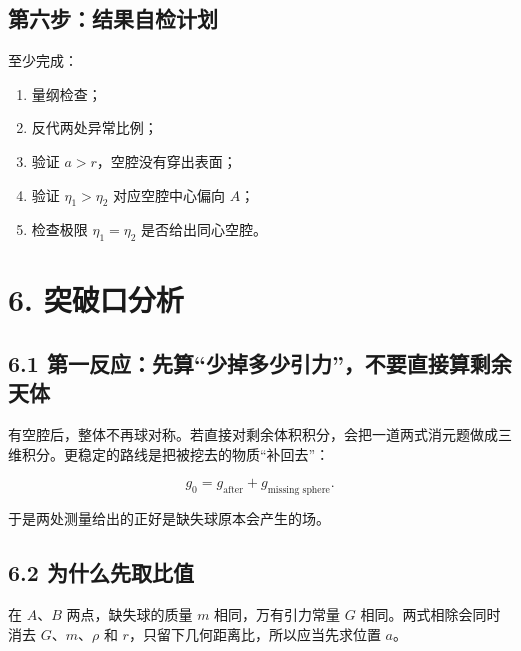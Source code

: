 \documentclass[
  11pt,
  UTF8]{ctexart}
\providecommand{\tightlist}{%
  \setlength{\itemsep}{0pt}\setlength{\parskip}{0pt}}
\begin{document}
\hypertarget{ux7b2cux516dux6b65ux7ed3ux679cux81eaux68c0ux8ba1ux5212}{%
\subsection{第六步：结果自检计划}\label{ux7b2cux516dux6b65ux7ed3ux679cux81eaux68c0ux8ba1ux5212}}

至少完成：

\begin{enumerate}
\def\labelenumi{\arabic{enumi}.}
\tightlist
\item
  量纲检查；
\item
  反代两处异常比例；
\item
  验证 \(a>r\)，空腔没有穿出表面；
\item
  验证 \(η_1>η_2\) 对应空腔中心偏向 \(A\)；
\item
  检查极限 \(η_1=η_2\) 是否给出同心空腔。
\end{enumerate}

\hypertarget{ux7a81ux7834ux53e3ux5206ux6790}{%
\section{6. 突破口分析}\label{ux7a81ux7834ux53e3ux5206ux6790}}

\hypertarget{ux7b2cux4e00ux53cdux5e94ux5148ux7b97ux5c11ux6389ux591aux5c11ux5f15ux529bux4e0dux8981ux76f4ux63a5ux7b97ux5269ux4f59ux5929ux4f53}{%
\subsection{6.1
第一反应：先算``少掉多少引力''，不要直接算剩余天体}\label{ux7b2cux4e00ux53cdux5e94ux5148ux7b97ux5c11ux6389ux591aux5c11ux5f15ux529bux4e0dux8981ux76f4ux63a5ux7b97ux5269ux4f59ux5929ux4f53}}

有空腔后，整体不再球对称。若直接对剩余体积积分，会把一道两式消元题做成三维积分。更稳定的路线是把被挖去的物质``补回去''：

\[g_0=g_{\text{after}}+g_{\text{missing sphere}}.\]

于是两处测量给出的正好是缺失球原本会产生的场。

\hypertarget{ux4e3aux4ec0ux4e48ux5148ux53d6ux6bd4ux503c}{%
\subsection{6.2
为什么先取比值}\label{ux4e3aux4ec0ux4e48ux5148ux53d6ux6bd4ux503c}}

在 \(A\)、\(B\) 两点，缺失球的质量 \(m\) 相同，万有引力常量 \(G\)
相同。两式相除会同时消去 \(G\)、\(m\)、\(ρ\) 和
\(r\)，只留下几何距离比，所以应当先求位置 \(a\)。
\end{document}
